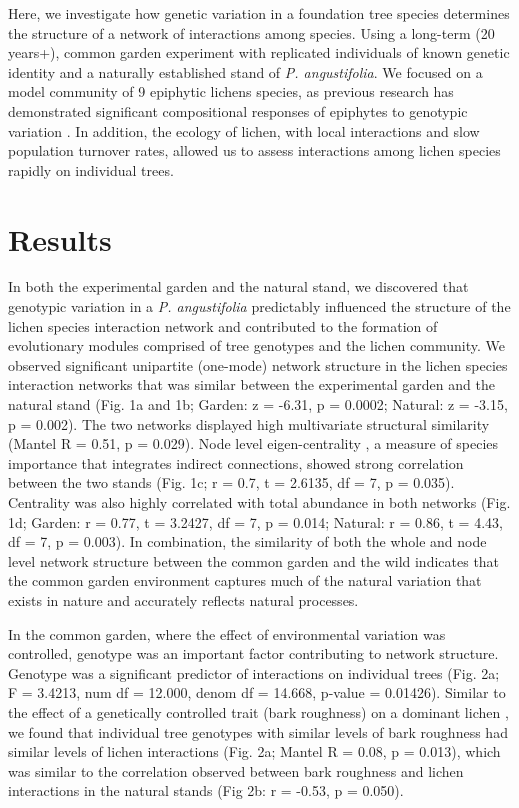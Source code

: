 \documentclass[fleqn,10pt]{wlscirep}
\begin{document}
Here, we investigate how genetic variation in a foundation tree
species determines the structure of a network of interactions among
species. Using a long-term (20 years+), common garden experiment with
replicated individuals of known genetic identity and a naturally
established stand of \textit{P. angustifolia}. We focused on a model
community of 9 epiphytic lichens species, as previous research has
demonstrated significant compositional responses of epiphytes to
genotypic variation \cite{Winfree2011, Zytynska2011}. In addition, the
ecology of lichen, with local interactions and slow population
turnover rates, allowed us to assess interactions among lichen species
rapidly on individual trees.



\section*{Results}


In both the experimental garden and the natural stand, we discovered
that genotypic variation in a \textit{P. angustifolia} predictably
influenced the structure of the lichen species interaction network and
contributed to the formation of evolutionary modules comprised of tree
genotypes and the lichen community.  We observed significant
unipartite (one-mode) network structure \cite{Araujo2011} in the
lichen species interaction networks that was similar between the
experimental garden and the natural stand (Fig. 1a and 1b; Garden: z =
-6.31, p = 0.0002; Natural: z = -3.15, p = 0.002). The two networks
displayed high multivariate structural similarity (Mantel R = 0.51, p
= 0.029). Node level eigen-centrality \cite{DeAngelis1989}, a measure
of species importance that integrates indirect connections, showed
strong correlation between the two stands (Fig. 1c; r = 0.7, t =
2.6135, df = 7, p = 0.035). Centrality was also highly correlated with
total abundance in both networks (Fig. 1d; Garden: r = 0.77, t =
3.2427, df = 7, p = 0.014; Natural:  r = 0.86, t = 4.43, df = 7, p =
0.003). In combination, the similarity of both the whole and node
level network structure between the common garden and the wild
indicates that the common garden environment captures much of the
natural variation that exists in nature and accurately reflects
natural processes.

In the common garden, where the effect of environmental variation was
controlled, genotype was an important factor contributing to network
structure. Genotype was a significant predictor of interactions on
individual trees (Fig. 2a; F = 3.4213, num df = 12.000, denom df =
14.668, p-value = 0.01426). Similar to the effect of a genetically
controlled trait (bark roughness) on a dominant lichen
\cite{Ellison2005}, we found that individual tree genotypes with
similar levels of bark roughness had similar levels of lichen
interactions (Fig. 2a; Mantel R = 0.08, p = 0.013), which was similar
to the correlation observed between bark roughness and lichen
interactions in the natural stands (Fig 2b: r = -0.53, p = 0.050).
\end{document}
